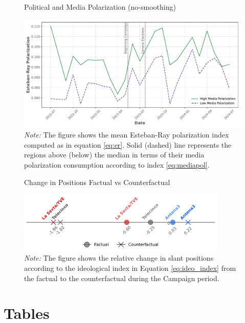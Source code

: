 \documentclass[12pt]{article}
\begin{document}
	\begin{figure}[ht!]
		\centering
		\caption{Political and Media Polarization (no-smoothing)}
		\includegraphics[width=150mm]{figures/er_polarization_stata_group_raw}
		\caption*{\textit{Note:} \small The figure shows the mean Esteban-Ray polarization index  computed as in equation \ref{eq:er}.  Solid (dashed) line represents the regions above (below) the median in terms of their media polarization consumption according to index \ref{eq:mediapol}.   }
		\label{fig:er}
	\end{figure}
	
	
	
	
	\begin{figure}[!htb]
		\centering
		\caption{Change in Positions Factual vs Counterfactual}
		\includegraphics[width=100mm]{figures/congress_line_counter}
		
		\caption*{\small \textit{Note:} The figure shows the relative change in  slant positions  according to the ideological index in Equation \ref{eq:ideo_index} from the factual to the counterfactual during the Campaign period.  }
		\label{fig:change_line_counter}
	\end{figure}
	
	
	
	
	\clearpage

\section{Tables}
	
	
	
\end{document}
